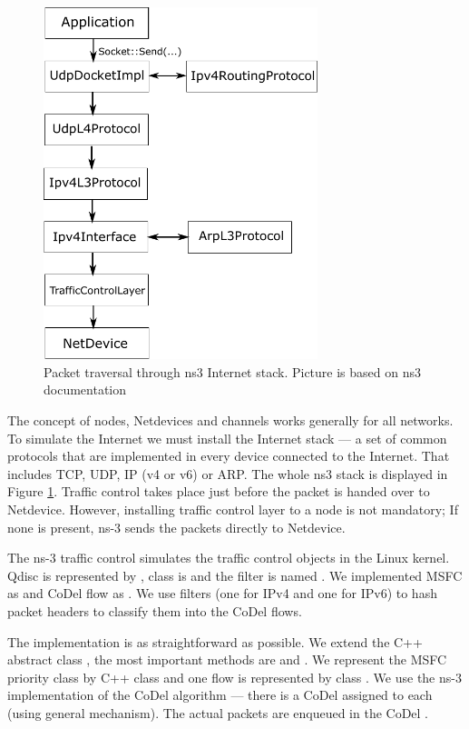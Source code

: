 \begin{figure}
	\centering
	\includegraphics[width=80mm]{drawings/ns3_internet_stack}
	\captionsetup{justification=centering}
	\caption{Packet traversal through ns3 Internet stack. Picture is based on ns3 documentation \cite[p. 88]{ns3Doc}}
	\label{fig13:ns3}
\end{figure}

The concept of nodes, Netdevices and channels works generally for all networks. To simulate the Internet we must install the Internet stack --- a set of common protocols that are implemented in every device connected to the Internet. That includes TCP, UDP, IP (v4 or v6) or ARP. The whole ns3 stack is displayed in Figure \ref{fig13:ns3}. Traffic control takes place just before the packet is handed over to Netdevice. However, installing traffic control layer to a node is not mandatory; If none is present, ns-3 sends the packets directly to Netdevice.

The ns-3 traffic control simulates the traffic control objects in the Linux kernel. Qdisc is represented by , class is  and the filter is named . We implemented MSFC as  and CoDel flow as . We use filters (one for IPv4 and one for IPv6) to hash packet headers to classify them into the CoDel flows.

\sloppypar
The implementation is as straightforward as possible. We extend the C++ abstract class , the most important methods are  and . We represent the MSFC priority class by C++ class  and one flow is represented by class . We use the ns-3 implementation of the CoDel algorithm --- there is a CoDel  assigned to each  (using general  mechanism). The actual packets are enqueued in the CoDel .

